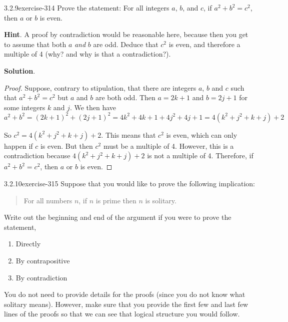 \documentclass[twoside,11pt,]{book}
\numberwithin{equation}{chapter}
\begin{document}
\begin{divisionsolution}{3.2.9}{}{exercise-314}%
\hypertarget{p-4157}{}%
Prove the statement: For all integers \(a\), \(b\), and \(c\), if \(a^2 + b^2 = c^2\), then \(a\) or \(b\) is even.%
\par\smallskip%
\noindent\textbf{Hint}.\quad%
\hypertarget{p-4158}{}%
A proof by contradiction would be reasonable here, because then you get to assume that both \(a\) \emph{and} \(b\) are odd.  Deduce that \(c^2\) is even, and therefore a multiple of 4 (why? and why is that a contradiction?).%
\par\smallskip%
\noindent\textbf{Solution}.\quad%
\begin{proof}{}
\hypertarget{p-4159}{}%
Suppose, contrary to stipulation, that there are integers \(a\), \(b\) and \(c\) such that \(a^2 + b^2 = c^2\) but \(a\) and \(b\) are both odd. Then \(a = 2k+1\) and \(b = 2j + 1\) for some integers \(k\) and \(j\). We then have%
\begin{equation*}
a^2 + b^2 = (2k+1)^2 + (2j+1)^2 = 4k^2 + 4k + 1 + 4j^2 + 4j + 1 = 4(k^2 + j^2 + k + j) + 2
\end{equation*}
%
\par
\hypertarget{p-4160}{}%
So \(c^2 = 4(k^2 + j^2 + k + j) + 2\). This means that \(c^2\) is even, which can only happen if \(c\) is even. But then \(c^2\) must be a multiple of 4. However, this is a contradiction because \(4(k^2 + j^2 + k + j) + 2\) is not a multiple of 4. Therefore, if \(a^2 + b^2 = c^2\), then \(a\) or \(b\) is even.%
\end{proof}
\end{divisionsolution}%
\begin{divisionsolution}{3.2.10}{}{exercise-315}%
\hypertarget{p-4161}{}%
Suppose that you would like to prove the following implication:%
\begin{quote}\hypertarget{blockquote-18}{}
\hypertarget{p-4162}{}%
For all numbers \(n\), if \(n\) is prime then \(n\) is solitary.%
\end{quote}
\hypertarget{p-4163}{}%
Write out the beginning and end of the argument if you were to prove the statement,\leavevmode%
\begin{enumerate}[label=(\alph*)]
\item\hypertarget{li-2141}{}\hypertarget{p-4164}{}%
Directly%
\item\hypertarget{li-2142}{}\hypertarget{p-4165}{}%
By contrapositive%
\item\hypertarget{li-2143}{}\hypertarget{p-4166}{}%
By contradiction%
\end{enumerate}
%
\par
\hypertarget{p-4167}{}%
You do not need to provide details for the proofs (since you do not know what solitary means). However, make sure that you provide the first few and last few lines of the proofs so that we can see that logical structure you would follow.%
\end{divisionsolution}%
\end{document}
